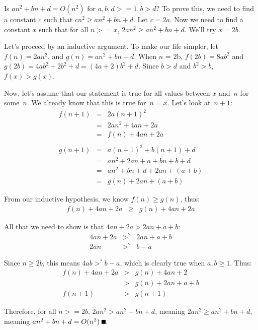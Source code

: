 \documentclass[onecolumn,11pt]{article}
\begin{document}
Is $an^2 + bn + d = O(n^2)$ for $a,b,d >= 1, b > d$?   
To prove this, we need to find a constant $c$
such that $cn^2 \ge an^2 + bn + d$.  Let $c=2a$.  Now we need
to find a constant $x$ such that for all $n >= x$, 
$2an^2 \ge an^2 + bn + d$.  We'll try $x = 2b$.  

Let's proceed by an inductive argument.  To make our life simpler, let $f(n) = 2an^2$, 
and $g(n) = an^2 + bn + d$.  When $n$ = 2b, $f(2b) = 8ab^2$ and $g(2b) = 4ab^2 + 2b^2 + d =
(4a+2)b^2 + d.$  Since $b > d$ and $b^2 > b$, $f(x) > g(x)$.

Now, let's assume that our statement is true for all values between
$x$ and~$n$ for some~$n$.  We already know that this is true for~$n=x$.
Let's look at~$n+1$:
\begin{eqnarray*}
f(n+1) & = & 2a(n+1)^2 \\ & = & 2an^2 + 4an + 2a \\
 & = & f(n) + 4an + 2a\\
& & \\
g(n+1) & = & a(n+1)^2 + b(n+1) + d \\ & = & an^2 + 2an + a + bn + b + d\\
    & = & an^2 + bn + d + 2an + (a + b)\\
    & = & g(n) + 2an + (a + b)
\end{eqnarray*}

From our inductive hypothesis, we know $f(n) \ge g(n)$, thus:
\begin{eqnarray*}
f(n) + 4an + 2a & \ge & g(n) + 4an + 2a
\end{eqnarray*}

All that we need to show is that $4an + 2a > 2an + a + b$:
\begin{eqnarray*}
4an + 2a & >^? & 2an + a + b\\
2an & >^? & b - a
\end{eqnarray*}

Since $n \ge 2b$, this means $4ab >^? b - a$, which is clearly true when $a,b \ge 1$.
Thus:
\begin{eqnarray*}
f(n) + 4an + 2a & > & g(n) + 4an +2\\
                & > & g(n) + 2an + a + b\\
f(n+1) & > & g(n+1)
\end{eqnarray*}

Therefore, for all $n >= 2b$, $2an^2 > an^2 + bn + d$, meaning 
$2an^2 \ge an^2 + bn + d$, meaning 
$an^2 + bn + d = O(n^2) \; \rule{2mm}{2mm}$.
\end{document}
